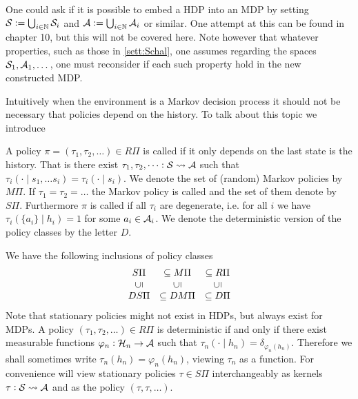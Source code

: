\begin{rem}
  One could ask if it is possible to embed a HDP into an MDP
  by setting
  $\mathcal{S} \vcentcolon= \bigcup_{i\in\mathbb{N}} \mathcal{S}_i$ and
  $\mathcal{A} \vcentcolon= \bigcup_{i\in\mathbb{N}} \mathcal{A}_i$ or similar.
  One attempt at this can be found in  chapter 10,
  but this will not be covered here. %
  Note however that whatever properties, such as those in \cref{sett:Schal},
  one assumes regarding the spaces $\mathcal{S}_1, \mathcal{A}_1, \dots$, one must 
  reconsider if each such property hold in the new constructed MDP.
\end{rem}
Intuitively when the environment is a Markov decision process
it should not be necessary that policies depend on the history.
To talk about this topic we introduce

\begin{defn}
  A policy $\pi = (\tau_1, \tau_2, \dots) \in R\Pi$
  is called  if it
  only depends on the last state is the history.
  That is there exist $\tau_1, \tau_2, \dots : \mathcal{S} \leadsto \mathcal{A}$
  such that $\tau_i(\cdot \mid s_1, \dots s_i) = \tau_i(\cdot \mid s_i)$.
  We denote the set of (random) Markov policies by $M\Pi$.
  If $\tau_1 = \tau_2 = \dots$ the Markov policy is called
  and the set of them denote by $S\Pi$.
  Furthermore $\pi$ is called  if all $\tau_i$
  are degenerate, i.e. for all $i$ we have
  $\tau_i(\{a_i\} \mid h_i) = 1$ for some $a_i \in \mathcal{A}_{i}$.
  We denote the deterministic version of the policy classes
  by the letter $D$.
\end{defn}
\begin{rem} 
  We have the following inclusions of policy classes
  \[ \begin{matrix}
      S\Pi &\subseteq M\Pi &\subseteq R\Pi
      \\ \rleft{\subseteq} & \rleft{\subseteq} & \rleft{\subseteq} 
      \\ DS\Pi &\subseteq DM\Pi &\subseteq D\Pi
  \end{matrix} \] 
  Note that stationary policies might not exist
  in HDPs, but always exist for MDPs.
  A policy $(\tau_1, \tau_2, \dots) \in R\Pi$ is deterministic
  if and only if there exist measurable
  functions $\varphi_n : \mathcal{H}_n \to \mathcal{A}$ such that
  $\tau_n(\cdot \mid h_n) = \delta_{\varphi_n(h_n)}$. Therefore we shall sometimes
  write $\tau_n(h_n) = \varphi_n(h_n)$, viewing $\tau_n$ as a function.
  For convenience
  will view stationary policies $\tau \in S\Pi$ interchangeably as kernels
  $\tau : \mathcal{S} \leadsto \mathcal{A}$ and as the policy
  $(\tau, \tau, \dots)$.
\end{rem}

